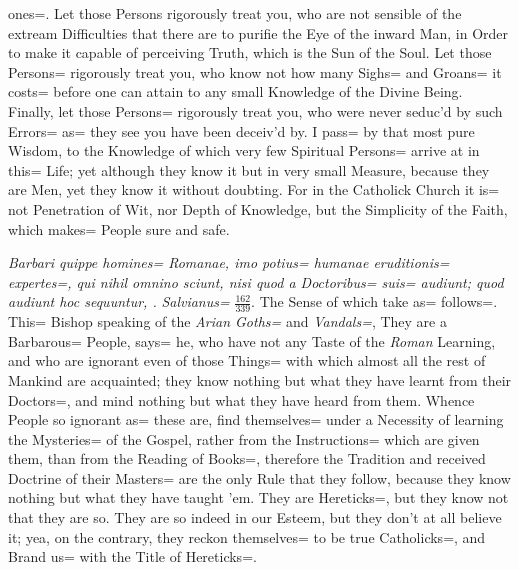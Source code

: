 \clearpage
\newpage
{}
\leavevmode\thispagestyle{empty}\newpage
{}
\label{place:HE2}
\marginpar{\color{red}\pageref{place:HE1}}
ones=.
Let those Persons rigorously treat you,
who are not sensible of the extream Difficulties that there are to purifie the Eye of the inward Man,
in Order to make it capable of perceiving Truth,
which is the Sun of the Soul.
Let those Persons= rigorously treat you,
who know not how many Sighs= and Groans= it costs= before one can attain to any small Knowledge of the Divine Being.
Finally,
let those Persons= rigorously treat you,
who were never seduc'd by such Errors= as= they see you have been deceiv'd by.
I pass= by that most pure Wisdom,
to the Knowledge of which very few Spiritual Persons= arrive at in this= Life;
yet although they know it but in very small Measure,
because they are Men, yet they know it without doubting.
For in the Catholick Church it is= not Penetration of Wit,
nor Depth of Knowledge, but the Simplicity of the Faith,
which makes= People sure and safe.

\textit{Barbari quippe homines= Romanae,
imo potius= humanae eruditionis= expertes=,
qui nihil omnino sciunt,
nisi quod a Doctoribus= suis= audiunt;
quod audiunt hoc sequuntur, \etc.}
\textit{Salvianus=} {\tiny$\displaystyle\frac{162}{339}$}.
The Sense of which take as= follows=.
This= Bishop speaking of the \emph{Arian Goths=} and \emph{Vandals=},
They are a Barbarous= People, says= he,
who have not any Taste of the \emph{Roman} Learning,
and who are ignorant even of those Things= with which almost all the rest of Mankind are acquainted;
they know nothing but what they have learnt from their Doctors=,
and mind nothing but what they have heard from them.
Whence People so ignorant as= these are,
find themselves= under a Necessity of learning the Mysteries= of the Gospel,
rather from the Instructions= which are given them,
than from the Reading of Books=,
therefore the Tradition and received Doctrine of their Masters= are the only Rule that they follow,
because they know nothing but what they have taught 'em.
They are Hereticks=,
but they know not that they are so.
They are so indeed in our Esteem,
but they don't at all believe it;
yea, on the contrary,
they reckon themselves= to be true Catholicks=,
and Brand us= with the Title of Hereticks=.

